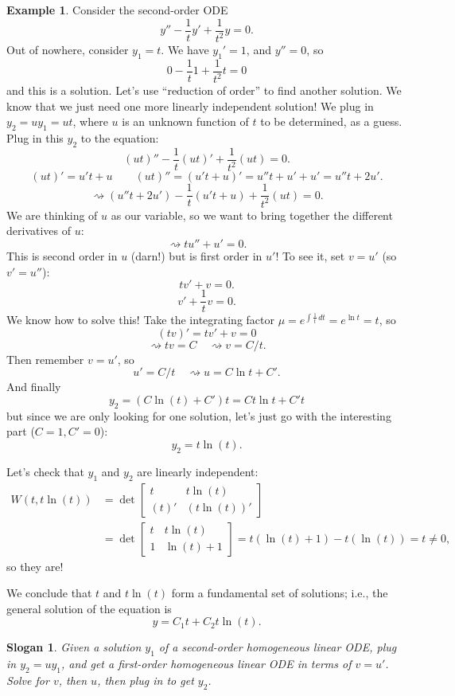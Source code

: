 \documentclass[12pt]{amsart}
\numberwithin{equation}{section}
\theoremstyle{plain} %
\newtheorem{slogan}[equation]{Slogan}
\newcommand{\rsa}{\rightsquigarrow}
\theoremstyle{definition}
\newtheorem{ex}[equation]{Example}
\theoremstyle{remark}
\begin{document}
\begin{ex} Consider the second-order ODE
\[ y'' - \frac{1}{t} y' + \frac{1}{t^2} y = 0.\]
Out of nowhere, consider $y_1= t$.
We have $y_1 ' = 1$, and $y'' = 0$, so
\[ 0 - \frac{1}{t} 1 + \frac{1}{t^2} t = 0\]
and this is a solution.
Let's use ``reduction of order'' to find another solution. We know that we just need one more linearly independent solution! We plug in $y_2= u y_1 = u t$, where $u$ is an unknown function of $t$ to be determined, as a guess.
Plug in this $y_2$ to the equation:
\[ (u t)'' -  \frac{1}{t} (ut)' + \frac{1}{t^2} (ut) = 0.\]
\[ (ut)' = u' t + u \qquad (ut)'' = (u' t + u )' = u'' t + u' + u' = u'' t + 2 u'.\]
\[ \rsa (u'' t + 2 u') -  \frac{1}{t} (u' t + u) + \frac{1}{t^2} (ut) = 0.\]
We are thinking of $u$ as our variable, so we want to bring together the different derivatives of $u$:
\[ \rsa t u''  + u' =0 .\]
This is second order in $u$ (darn!) but is first order in $u'$! To see it, set $v=u'$ (so $v'=u''$):
\[ t v' + v = 0.\]
\[ v' + \frac{1}{t} v = 0.\]
We know how to solve this!
Take the integrating factor $\mu = e^{\int \frac{1}{t} \, dt} = e^{\ln t} = t$, so
\[ (tv)' = tv' + v = 0\]
\[\rsa tv = C \quad \rsa v= C/t. \]
Then remember $v=u'$, so
\[ u' = C/t \quad \rsa u= C \ln t + C'.\]
And finally
\[ y_2 =  (C \ln(t) + C')t = C t \ln t + C' t\]
but since we are only looking for one solution, let's just go with the interesting part ($C=1, C'=0$):
\[ y_2 = t \ln(t).\]

Let's check that $y_1$ and $y_2$ are linearly independent:
\begin{align*} W( t, t \ln(t) ) &=  \det \begin{bmatrix} t & t \ln(t) \\ (t)' &(t \ln(t))' \end{bmatrix} \\&= \det \begin{bmatrix} t & t \ln(t) \\ 1 & \ln(t) + 1 \end{bmatrix} = t(\ln(t) +1) - t(\ln(t)) = t\neq 0,\end{align*}
so they are!

We conclude that $t$ and $t \ln(t)$ form a fundamental set of solutions; i.e., the general solution of the equation is
\[ y =C_1 t + C_2 t \ln(t).\]
\end{ex}
 

 

\begin{slogan}
Given a solution $y_1$ of a second-order homogeneous linear ODE, plug in $y_2= u y_1$, and get a first-order homogeneous linear ODE in terms of $v=u'$. Solve for $v$, then $u$, then plug in to get $y_2$.
\end{slogan}

\printindex
\end{document}
